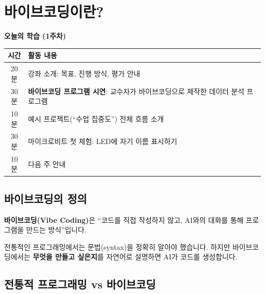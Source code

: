 \documentclass[11pt, a4paper]{article}
\begin{document}
\section{바이브코딩이란?}

\begin{info}
\textbf{오늘의 학습 (1주차)}

\begin{center}
\begin{tabular}{c l}
\toprule
\textbf{시간} & \textbf{활동 내용} \\
\midrule
20분 & 강좌 소개: 목표, 진행 방식, 평가 안내 \\
30분 & \textbf{바이브코딩 프로그램 시연}: 교수자가 바이브코딩으로 제작한 데이터 분석 프로그램 \\
10분 & 예시 프로젝트(``수업 집중도'') 전체 흐름 소개 \\
30분 & 마이크로비트 첫 체험: LED에 자기 이름 표시하기 \\
10분 & 다음 주 안내 \\
\bottomrule
\end{tabular}
\end{center}
\end{info}

\subsection{바이브코딩의 정의}

\textbf{바이브코딩(Vibe Coding)}은 ``코드를 직접 작성하지 않고, AI와의 대화를 통해 프로그램을 만드는 방식''입니다. 

전통적인 프로그래밍에서는 문법(syntax)을 정확히 알아야 했습니다. 하지만 바이브코딩에서는 \textbf{무엇을 만들고 싶은지}를 자연어로 설명하면 AI가 코드를 생성합니다.

\subsection{전통적 프로그래밍 vs 바이브코딩}
\end{document}
